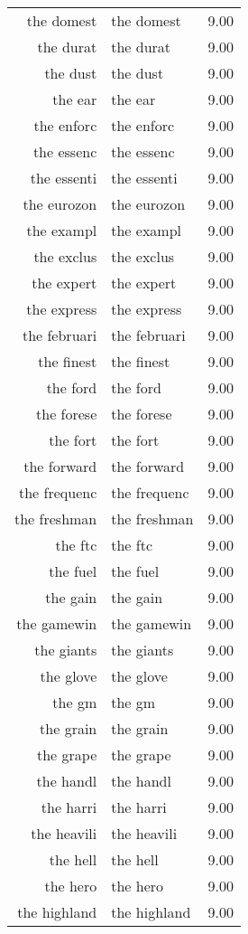 \begin{table}[ht]
\begin{tabular}{rlr}
  the domest & the domest & 9.00 \\ 
  the durat & the durat & 9.00 \\ 
  the dust & the dust & 9.00 \\ 
  the ear & the ear & 9.00 \\ 
  the enforc & the enforc & 9.00 \\ 
  the essenc & the essenc & 9.00 \\ 
  the essenti & the essenti & 9.00 \\ 
  the eurozon & the eurozon & 9.00 \\ 
  the exampl & the exampl & 9.00 \\ 
  the exclus & the exclus & 9.00 \\ 
  the expert & the expert & 9.00 \\ 
  the express & the express & 9.00 \\ 
  the februari & the februari & 9.00 \\ 
  the finest & the finest & 9.00 \\ 
  the ford & the ford & 9.00 \\ 
  the forese & the forese & 9.00 \\ 
  the fort & the fort & 9.00 \\ 
  the forward & the forward & 9.00 \\ 
  the frequenc & the frequenc & 9.00 \\ 
  the freshman & the freshman & 9.00 \\ 
  the ftc & the ftc & 9.00 \\ 
  the fuel & the fuel & 9.00 \\ 
  the gain & the gain & 9.00 \\ 
  the gamewin & the gamewin & 9.00 \\ 
  the giants & the giants & 9.00 \\ 
  the glove & the glove & 9.00 \\ 
  the gm & the gm & 9.00 \\ 
  the grain & the grain & 9.00 \\ 
  the grape & the grape & 9.00 \\ 
  the handl & the handl & 9.00 \\ 
  the harri & the harri & 9.00 \\ 
  the heavili & the heavili & 9.00 \\ 
  the hell & the hell & 9.00 \\ 
  the hero & the hero & 9.00 \\ 
  the highland & the highland & 9.00 \\ 

\end{tabular}
\end{table}
